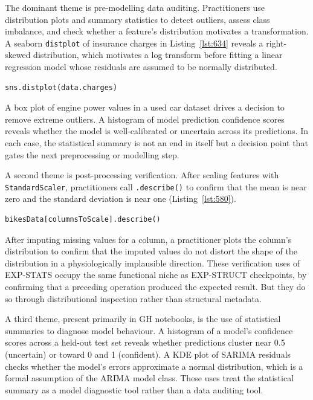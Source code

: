 The dominant theme is pre-modelling data auditing.
Practitioners use distribution plots and summary statistics
to detect outliers,
assess class imbalance,
and check whether a feature's distribution motivates a transformation.
A seaborn \lstinline{distplot} of insurance charges in Listing~\ref{lst:634}
reveals a right-skewed distribution,
which motivates a log transform
before fitting a linear regression model
whose residuals are assumed to be normally distributed.

\begin{lstlisting}[caption={}, label={lst:634}]
sns.distplot(data.charges)
\end{lstlisting}

A box plot of engine power values
in a used car dataset
drives a decision to remove extreme outliers.
A histogram of model prediction confidence scores
reveals whether the model is well-calibrated
or uncertain across its predictions.
In each case,
the statistical summary is not an end in itself
but a decision point that gates the next preprocessing or modelling step.

A second theme is post-processing verification.
After scaling features with \lstinline{StandardScaler},
practitioners call \lstinline{.describe()}
to confirm that the mean is near zero and the standard deviation is near one
(Listing~\ref{lst:580}).

\begin{lstlisting}[caption={}, label={lst:580}]
bikesData[columnsToScale].describe()
\end{lstlisting}

After imputing missing values for a column,
a practitioner plots the column's distribution
to confirm that the imputed values
do not distort the shape of the distribution
in a physiologically implausible direction.
These verification uses of EXP-STATS
occupy the same functional niche as EXP-STRUCT checkpoints,
by confirming that a preceding operation produced the expected result.
But they do so through distributional inspection
rather than structural metadata.

A third theme,
present primarily in GH notebooks,
is the use of statistical summaries to diagnose model behaviour.
A histogram of a model's confidence scores across a held-out test set
reveals whether predictions cluster near 0.5 (uncertain) or toward 0 and 1 (confident).
A KDE plot of SARIMA residuals checks whether the model's errors
approximate a normal distribution,
which is a formal assumption of the ARIMA model class.
These uses treat the statistical summary
as a model diagnostic tool rather than a data auditing tool.

